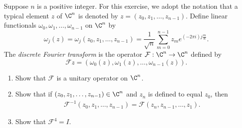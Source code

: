 \documentclass{extarticle}
\begin{document}
\begin{problem}{19}
    Suppose \( n \) is a positive integer. For this exercise, we adopt the notation that a typical
    element \( z \) of \( \C^n \) is denoted by \( z = (z_0, z_1, \ldots, z_{n-1}) \).
    Define linear functionals \( \omega_0, \omega_1, \ldots, \omega_{n-1} \) on \( \C^n \) by
    \begin{equation*}
        \omega_j(z) = \omega_j(z_0, z_1, \ldots, z_{n-1}) = \frac{1}{\sqrt{n}} \sum_{m=0}^{n-1}
        {z_m e^{(-2 \pi i) j \frac{m}{n}}}.
    \end{equation*}
    The \textit{discrete Fourier transform} is the operator \( \mathcal{F}: \C^n \rightarrow \C^n \)
    defined by
    \begin{equation*}
        \mathcal{F}z = (\omega_0(z), \omega_1(z), \ldots, \omega_{n-1}(z)).
    \end{equation*}
    \begin{enumerate}[label=(\alph*)]
        \item Show that \(  \mathcal{F} \) is a unitary operator on \( \C^n \).
        \item Show that if \( (z_0, z_1, \ldots, z_{n-1}) \in \C^n \) and
            \( z_n \) is defined to equal \( z_0 \), then
            \begin{gather*}
                \mathcal{F}^{-1}  (z_0, z_1, \ldots, z_{n-1}) =
                \mathcal{F} (z_n, z_{n-1}, \ldots, z_{1}).
            \end{gather*}
        \item  Show that \( \mathcal{F}^4 = I \).
    \end{enumerate}
\end{problem}
\end{document}
